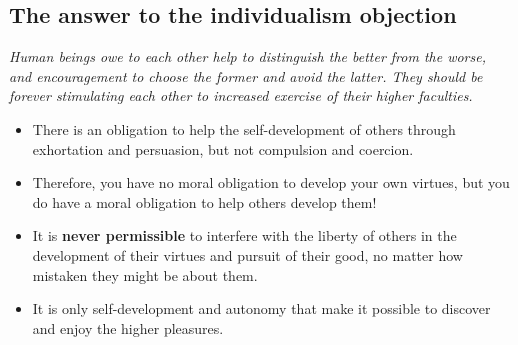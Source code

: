 \subsection{The answer to the individualism objection}

\textit{Human beings owe to each other help to distinguish the better from
the worse, and encouragement to choose the former and avoid the latter. They
should be forever stimulating each other to increased exercise of their
higher faculties.}

\begin{itemize}
    \item There is an obligation to help the self-development of others
    through exhortation and persuasion, but not compulsion and coercion.
    \item Therefore, you have no moral obligation to develop your own virtues,
    but you do have a moral obligation to help others develop them!
    \item It is \textbf{never permissible} to interfere with the liberty of
    others in the development of their virtues and pursuit of their good, no
    matter how mistaken they might be about them.
    \item It is only self-development and autonomy that make it possible to
    discover and enjoy the higher pleasures.
\end{itemize}

